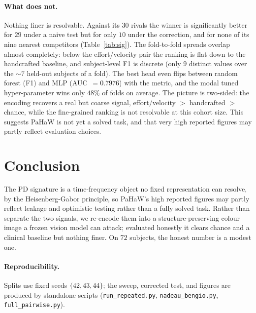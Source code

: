 \documentclass{article}
\begin{document}
\paragraph{What does not.}
Nothing finer is resolvable. Against its $30$ rivals the winner is significantly
better for $29$ under a naive test but for only $10$ under the correction, and for
none of its nine nearest competitors (Table~\ref{tab:sig}). The fold-to-fold spreads overlap
almost completely: below the effort/velocity pair the ranking is flat down to the
handcrafted baseline, and subject-level F1 is discrete (only $9$ distinct values over
the $\sim\!7$ held-out subjects of a fold). The best head even flips
between random forest (F1) and MLP (AUC~$=0.7976$) with the metric, and the modal
tuned hyper-parameter wins only $48\%$ of folds on average. The picture is
two-sided: the encoding recovers a real but coarse signal, effort/velocity $>$
handcrafted $>$ chance, while the fine-grained ranking is not resolvable at this
cohort size. This suggests PaHaW is not yet a solved task, and that very high
reported figures may partly reflect evaluation choices.

\section{Conclusion}
The PD signature is a time-frequency object no fixed representation can resolve, by
the Heisenberg-Gabor principle, so PaHaW's high reported figures may partly reflect
leakage and optimistic testing rather than a fully solved task. Rather than separate
the two signals, we re-encode them into a structure-preserving colour image a frozen
vision model can attack; evaluated honestly it clears chance and a clinical baseline
but nothing finer. On $72$ subjects, the honest number is a modest one.

\paragraph{Reproducibility.}
Splits use fixed seeds $\{42,43,44\}$; the sweep, corrected test, and figures are
produced by standalone scripts (\texttt{run\_repeated.py}, \texttt{nadeau\_bengio.py},
\texttt{full\_pairwise.py}).

\small


\end{document}
